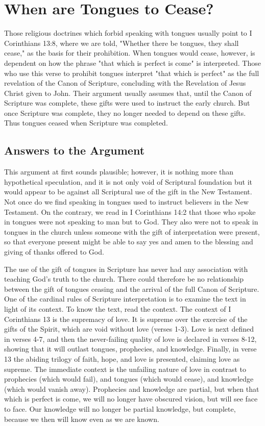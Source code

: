 \chapter{When are Tongues to Cease?}

Those religious doctrines which forbid speaking with tongues usually point to I Corinthians 13:8, where we are told, "Whether there be tongues, they shall cease," as the basis for their prohibition. When tongues would cease, however, is dependent on how the phrase "that which is perfect is come" is interpreted. Those who use this verse to prohibit tongues interpret "that which is perfect" as the full revelation of the Canon of Scripture, concluding with the Revelation of Jesus Christ given to John. Their argument usually assumes that, until the Canon of Scripture was complete, these gifts were used to instruct the early church. But once Scripture was complete, they no longer needed to depend on these gifts. Thus tongues ceased when Scripture was completed. 

\section*{Answers to the Argument}

This argument at first sounds plausible; however, it is nothing more than hypothetical speculation, and it is not only void of Scriptural foundation but it would appear to be against all Scriptural use of the gift in the New Testament. Not once do we find speaking in tongues used to instruct believers in the New Testament. On the contrary, we read in I Corinthians 14:2 that those who spoke in tongues were not speaking to man but to God. They also were not to speak in tongues in the church unless someone with the gift of interpretation were present, so that everyone present might be able to say yes and amen to the blessing and giving of thanks offered to God. 

The use of the gift of tongues in Scripture has never had any association with teaching God's truth to the church. There could therefore be no relationship between the gift of tongues ceasing and the arrival of the full Canon of Scripture. One of the cardinal rules of Scripture interpretation is to examine the text in light of its context. To know the text, read the context. The context of I Corinthians 13 is the supremacy of love. It is supreme over the exercise of the gifts of the Spirit, which are void without love (verses 1-3). Love is next defined in verses 4-7, and then the never-failing quality of love is declared in verses 8-12, showing that it will outlast tongues, prophecies, and knowledge. Finally, in verse 13 the abiding trilogy of faith, hope, and love is presented, claiming love as supreme. The immediate context is the unfailing nature of love in contrast to prophecies (which would fail), and tongues (which would cease), and knowledge (which would vanish away). Prophecies and knowledge are partial, but when that which is perfect is come, we will no longer have obscured vision, but will see face to face. Our knowledge will no longer be partial knowledge, but complete, because we then will know even as we are known. 

